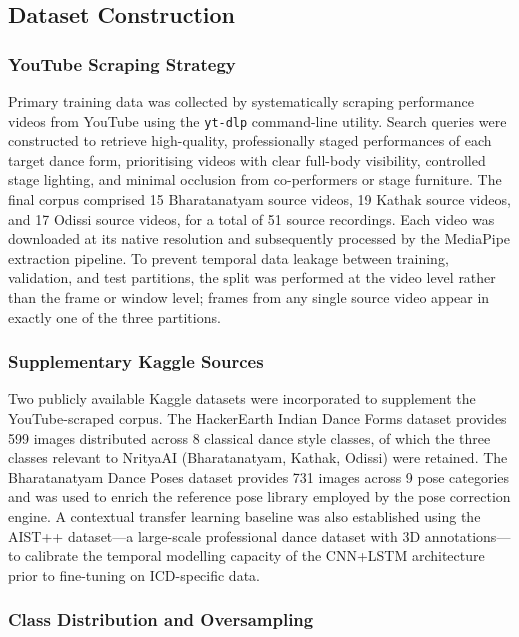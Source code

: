 \documentclass[journal]{IEEEtran}
\begin{document}
\subsection{Dataset Construction}

\subsubsection{YouTube Scraping Strategy}

Primary training data was collected by systematically scraping
performance videos from YouTube using the \texttt{yt-dlp} command-line
utility. Search queries were constructed to retrieve high-quality,
professionally staged performances of each target dance form, prioritising
videos with clear full-body visibility, controlled stage lighting, and
minimal occlusion from co-performers or stage furniture. The final
corpus comprised 15 Bharatanatyam source videos, 19 Kathak source
videos, and 17 Odissi source videos, for a total of 51 source recordings.
Each video was downloaded at its native resolution and subsequently
processed by the MediaPipe extraction pipeline. To prevent temporal
data leakage between training, validation, and test partitions, the
split was performed at the video level rather than the frame or window
level; frames from any single source video appear in exactly one of the
three partitions.

\subsubsection{Supplementary Kaggle Sources}

Two publicly available Kaggle datasets were incorporated to supplement
the YouTube-scraped corpus. The HackerEarth Indian Dance Forms dataset
provides 599 images distributed across 8 classical dance style classes,
of which the three classes relevant to NrityaAI (Bharatanatyam, Kathak,
Odissi) were retained. The Bharatanatyam Dance Poses dataset provides
731 images across 9 pose categories and was used to enrich the
reference pose library employed by the pose correction engine. A
contextual transfer learning baseline was also established using the
AIST++ dataset—a large-scale professional dance dataset with 3D
annotations—to calibrate the temporal modelling capacity of the
CNN+LSTM architecture prior to fine-tuning on ICD-specific data.

\subsubsection{Class Distribution and Oversampling}
\end{document}
